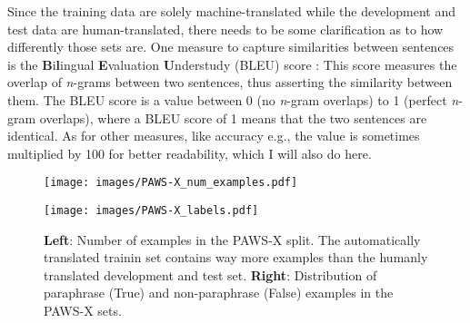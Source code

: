 Since the training data are solely machine-translated while the development and test data
are human-translated, there needs to be some clarification as to how differently those sets
are. One measure to capture similarities between sentences is the \textbf{B}i\textbf{l}ingual
\textbf{E}valuation \textbf{U}nderstudy (BLEU) score \cite{papineni2002bleu}: This score
measures the overlap of \textit{n}-grams between two sentences, thus asserting the similarity
between them. The BLEU score is a value between 0 (no \textit{n}-gram overlaps) to 1 (perfect
\textit{n}-gram overlaps), where a BLEU score of 1 means that the two sentences are identical.
As for other measures, like accuracy e.g., the value is sometimes multiplied by 100 for better
readability, which I will also do here.


\begin{figure}
  \begin{minipage}{0.45\linewidth}
  \vspace{0pt}
    \texttt{[image: images/PAWS-X\_num\_examples.pdf]}
  \end{minipage}
  \hfill
  \begin{minipage}{0.45\linewidth}
  \vspace{0pt}
    \texttt{[image: images/PAWS-X\_labels.pdf]}
  \end{minipage}
  \caption[PAWS-X Set Size/Labels]{\textbf{Left}: Number of examples in the PAWS-X split. The automatically translated
                           trainin set contains way more examples than the humanly translated development and test set.
                           \textbf{Right}: Distribution of paraphrase (True) and non-paraphrase (False) examples in the
                           PAWS-X sets.}
  \label{fig:pawsx-stat}
\end{figure}

